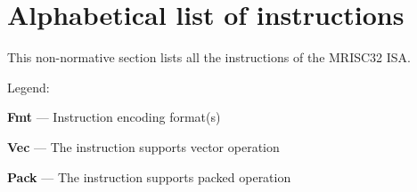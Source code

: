 %

\onecolumn

\chapter{Alphabetical list of instructions}

This non-normative section lists all the instructions of the MRISC32 ISA.

Legend:
\begin{bulletitems}
  \item{\textbf{Fmt} --- Instruction encoding format(s)}
  \item{\textbf{Vec} --- The instruction supports vector operation}
  \item{\textbf{Pack} --- The instruction supports packed operation}
\end{bulletitems}



\twocolumn
